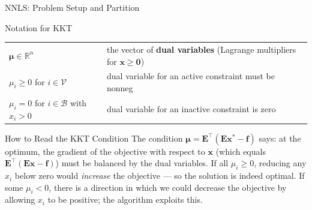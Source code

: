 \documentclass[aspectratio=169,10pt]{beamer}
\newcommand{\bx}{\mathbf{x}}
\newcommand{\bE}{\mathbf{E}}
\newcommand{\bmu}{\boldsymbol{\mu}}
\newcommand{\R}{\mathbb{R}}
\begin{document}
\begin{frame}[allowframebreaks]{NNLS: Problem Setup and Partition}
  \begin{block}{Notation for KKT}
    \begin{tabular}{ll}
      $\bmu \in \R^n$ & the vector of \textbf{dual variables} (Lagrange multipliers for $\bx \geq \mathbf{0}$)\\
      $\mu_i \geq 0$ for $i \in \mathcal{V}$ & dual variable for an active constraint must be nonneg\\
      $\mu_i = 0$ for $i \in \mathcal{B}$ with $x_i > 0$ & dual variable for an inactive constraint is zero\\
    \end{tabular}
  \end{block}

  \begin{alertblock}{How to Read the KKT Condition}
    The condition $\bmu = \bE^{\top}(\bE\bx^* - \mathbf{f})$ says: at the optimum,
    the gradient of the objective with respect to $\bx$ (which equals $\bE^{\top}(\bE\bx - \mathbf{f})$)
    must be balanced by the dual variables.  If all $\mu_i \geq 0$, reducing any
    $x_i$ below zero would \emph{increase} the objective --- so the solution is indeed optimal.
    If some $\mu_i < 0$, there is a direction in which we could decrease the objective
    by allowing $x_i$ to be positive; the algorithm exploits this.
  \end{alertblock}

\end{frame}
\end{document}
